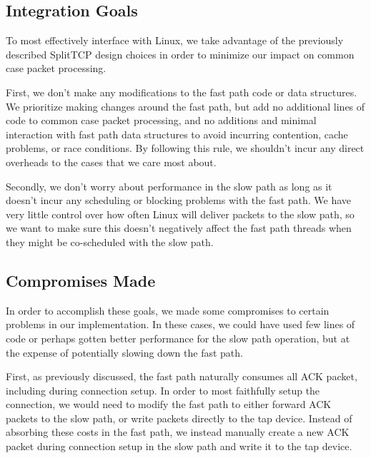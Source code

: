 \subsection{Integration Goals}

To most effectively interface with Linux, we take advantage of the previously 
described SplitTCP design choices in order to minimize our impact on common case
packet processing. 

First, we don't make any modifications to the fast path code or data structures.
We prioritize making changes around the fast path, but add no additional lines 
of code to common case packet processing, and no additions and minimal 
interaction with fast path data structures to avoid incurring contention, cache 
problems, or race conditions. By following this rule, we shouldn't incur any
direct overheads to the cases that we care most about.

Secondly, we don't worry about performance in the slow path as long as it
doesn't incur any scheduling or blocking problems with the fast path. We have 
very little control over how often Linux will deliver packets to the slow path, 
so we want to make sure this doesn't negatively affect the fast path threads 
when they might be co-scheduled with the slow path. 

\subsection{Compromises Made}

In order to accomplish these goals, we made some compromises to certain problems
in our implementation. In these cases, we could have used few lines of code or 
perhaps gotten better performance for the slow path operation, but at the 
expense of potentially slowing down the fast path.

First, as previously discussed, the fast path naturally consumes all ACK packet,
including during connection setup. In order to most faithfully setup the 
connection, we would need to modify the fast path to either forward ACK packets 
to the slow path, or write packets directly to the tap device. Instead of 
absorbing these costs in the fast path, we instead manually create a new ACK
packet during connection setup in the slow path and write it to the tap device.

